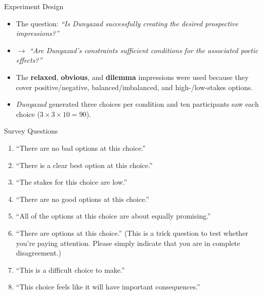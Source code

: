 \documentclass[xcolor=x11names]{beamer}
\def\dunyazad/{\textit{Dunyazad}}
\begin{document}
\begin{frame}{Experiment Design}
  \begin{itemize}\addtolength{\itemsep}{0.5\baselineskip}
    \item The question: \emph{``Is \dunyazad/ successfully creating the desired prospective impressions?''}
    \pause
    \item $\rightarrow$ \emph{``Are \dunyazad/'s constraints sufficient conditions for the associated poetic effects?''}
    \pause
    \item The \textbf{relaxed}, \textbf{obvious}, and \textbf{dilemma} impressions were used because they cover positive/negative, balanced/imbalanced, and high-/low-stakes options.
    \item \dunyazad/ generated three choices per condition and ten participants saw each choice ($3 \times 3 \times 10 = 90$).
  \end{itemize}
\end{frame}

\begin{frame}{Survey Questions}
  \itshape
  \begin{enumerate}\addtolength{\itemsep}{0.5\baselineskip}
    \item ``There are no bad options at this choice.''
    \item ``There is a clear best option at this choice.''
    \item ``The stakes for this choice are low.''
    \item ``There are no good options at this choice.''
    \item ``All of the options at this choice are about equally promising.''
    \item ``There are options at this choice.'' (This is a trick question to test whether you're paying attention. Please simply indicate that you are in complete disagreement.)
    \item ``This is a difficult choice to make.''
    \item ``This choice feels like it will have important consequences.''
  \end{enumerate}
\end{frame}
\end{document}
